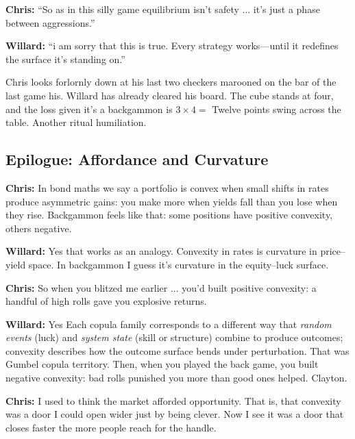 \vspace{0.5em}

\noindent\textbf{Chris:} ``So as in this silly game equilibrium isn’t safety ... it’s just a phase between aggressions.''

\noindent\textbf{Willard:} ``i am sorry that this is true. Every strategy works—until it redefines the surface it’s standing on.''

\vspace{1em}

Chris looks forlornly down at his last two checkers marooned on the bar of the last game his. Willard has already cleared his board. The cube stands at four, and the loss given it's a backgammon is $3\times4=$ Twelve points swing across the table. Another ritual humiliation.

\vspace{1em}

\subsection*{Epilogue: Affordance and Curvature}

\textbf{Chris:}    
In bond maths we say a portfolio is convex when small shifts in rates produce asymmetric gains: you make more when yields fall than you lose when they rise.  Backgammon feels like that:  some positions have positive convexity, others negative.

\textbf{Willard:}  
Yes that works as an analogy.  Convexity in rates is curvature in price–yield space.  In backgammon I guess it’s curvature in the equity–luck surface.

\textbf{Chris:}  
So when you blitzed me earlier ... you’d built positive convexity:  a handful of high rolls gave you explosive returns.

\textbf{Willard:} 
Yes Each copula family corresponds to a different way that \emph{random events}
(luck) and \emph{system state} (skill or structure) combine to produce outcomes; convexity describes how the outcome surface bends under perturbation. That was Gumbel copula territory.  Then, when you played the back game, you built negative convexity: bad rolls punished you more than good ones helped. Clayton.

\medskip
\textbf{Chris:}  
I used to think the market afforded opportunity. That is,  that convexity was a door I could open wider just by being clever.  Now I see it was a door that closes faster  the more people reach for the handle.

